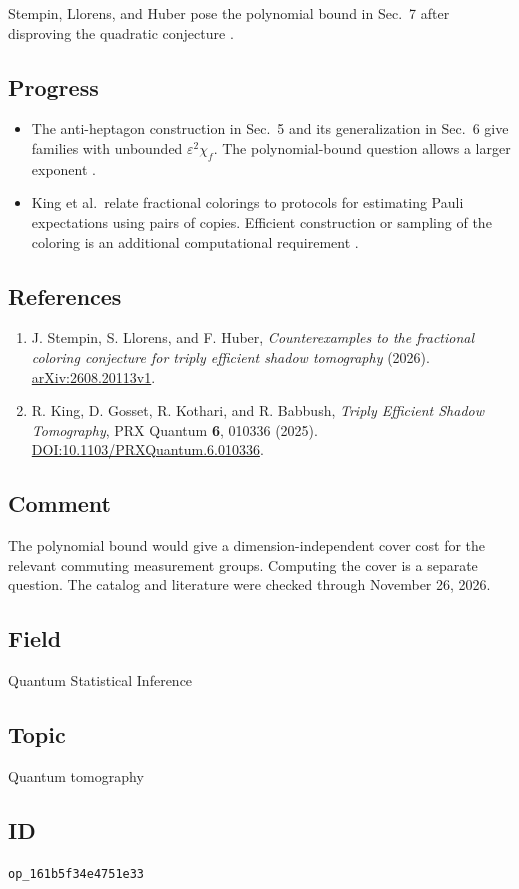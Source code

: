 Stempin, Llorens, and Huber pose the polynomial bound in Sec.~7 after disproving the quadratic conjecture .

\subsection*{Progress}

\begin{itemize}
  \item The anti-heptagon construction in Sec.~5 and its generalization in Sec.~6 give families with unbounded $\varepsilon^2\chi_f$. The polynomial-bound question allows a larger exponent .

  \item King et al.\ relate fractional colorings to protocols for estimating Pauli expectations using pairs of copies. Efficient construction or sampling of the coloring is an additional computational requirement .
\end{itemize}

\subsection*{References}

\begin{enumerate}[label={},leftmargin=4.8em,labelsep=0.5em]
  \footnotesize
  \item[\textup{[SLH26]}]\label{ref:pauli-coloring}
  J. Stempin, S. Llorens, and F. Huber, \emph{Counterexamples to the fractional coloring conjecture for triply efficient shadow tomography} (2026). \href{https://arxiv.org/abs/2608.20113v1}{arXiv:2608.20113v1}.

  \item[\textup{[KGKB25]}]\label{ref:triply-efficient}
  R. King, D. Gosset, R. Kothari, and R. Babbush, \emph{Triply Efficient Shadow Tomography}, PRX Quantum \textbf{6}, 010336 (2025). \href{https://doi.org/10.1103/PRXQuantum.6.010336}{DOI:10.1103/PRXQuantum.6.010336}.
\end{enumerate}

\subsection*{Comment}

The polynomial bound would give a dimension-independent cover cost for the relevant commuting measurement groups. Computing the cover is a separate question. The catalog and literature were checked through November 26, 2026.

\subsection*{Field}

Quantum Statistical Inference

\subsection*{Topic}

Quantum tomography

\subsection*{ID}

\texttt{op\_161b5f34e4751e33}
